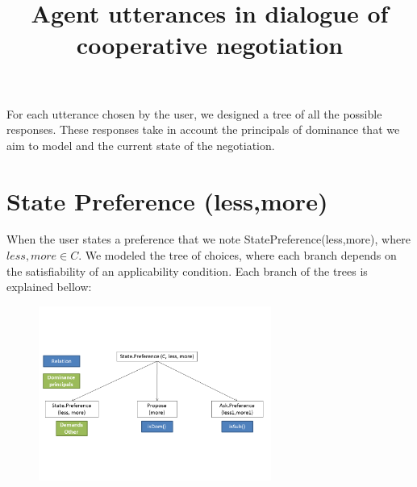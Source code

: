 \documentclass{llncs}
\begin{document}
\title{Agent utterances in dialogue of cooperative negotiation}
\maketitle 

For each utterance chosen by the user, we designed a tree of all the possible responses. These responses take in account the principals of dominance that we aim to model and the current state of the negotiation.

\section{State Preference (less,more)}
When the user states a preference that we note StatePreference(less,more), where $less, more \in C$.  We modeled the tree of choices, where each branch depends on the satisfiability of an applicability condition. Each branch of the trees is explained bellow:
	\begin{figure}[]
						\centerline{\includegraphics[width=3in]{figs/utterances_v2/Diapositive1.PNG}}
						\vskip 8pt
	\end{figure}
		
\end{document}
